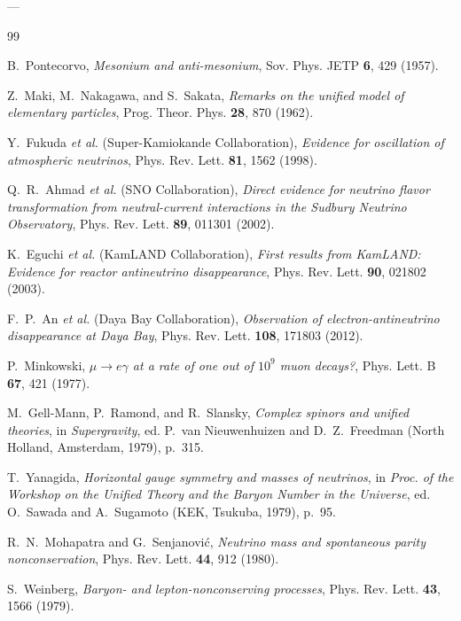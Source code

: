 \documentclass[11pt,a4paper]{article}
\theoremstyle{definition}
\begin{document}
---

\begin{thebibliography}{99}

B.~Pontecorvo, \textit{Mesonium and anti-mesonium}, Sov. Phys. JETP \textbf{6}, 429 (1957).

Z.~Maki, M.~Nakagawa, and S.~Sakata, \textit{Remarks on the unified model of elementary particles}, Prog. Theor. Phys. \textbf{28}, 870 (1962).

Y.~Fukuda \textit{et al.} (Super-Kamiokande Collaboration), \textit{Evidence for oscillation of atmospheric neutrinos}, Phys. Rev. Lett. \textbf{81}, 1562 (1998).

Q.~R.~Ahmad \textit{et al.} (SNO Collaboration), \textit{Direct evidence for neutrino flavor transformation from neutral-current interactions in the Sudbury Neutrino Observatory}, Phys. Rev. Lett. \textbf{89}, 011301 (2002).

K.~Eguchi \textit{et al.} (KamLAND Collaboration), \textit{First results from KamLAND: Evidence for reactor antineutrino disappearance}, Phys. Rev. Lett. \textbf{90}, 021802 (2003).

F.~P.~An \textit{et al.} (Daya Bay Collaboration), \textit{Observation of electron-antineutrino disappearance at Daya Bay}, Phys. Rev. Lett. \textbf{108}, 171803 (2012).

P.~Minkowski, \textit{$\mu \to e\gamma$ at a rate of one out of $10^9$ muon decays?}, Phys. Lett. B \textbf{67}, 421 (1977).

M.~Gell-Mann, P.~Ramond, and R.~Slansky, \textit{Complex spinors and unified theories}, in \textit{Supergravity}, ed. P.~van Nieuwenhuizen and D.~Z.~Freedman (North Holland, Amsterdam, 1979), p.~315.

T.~Yanagida, \textit{Horizontal gauge symmetry and masses of neutrinos}, in \textit{Proc. of the Workshop on the Unified Theory and the Baryon Number in the Universe}, ed. O.~Sawada and A.~Sugamoto (KEK, Tsukuba, 1979), p.~95.

R.~N.~Mohapatra and G.~Senjanovi\'c, \textit{Neutrino mass and spontaneous parity nonconservation}, Phys. Rev. Lett. \textbf{44}, 912 (1980).

S.~Weinberg, \textit{Baryon- and lepton-nonconserving processes}, Phys. Rev. Lett. \textbf{43}, 1566 (1979).


\end{thebibliography}
\end{document}
